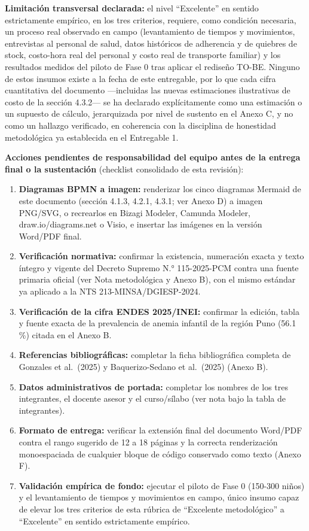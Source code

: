 \documentclass[11pt,a4paper]{article}
\providecommand{\tightlist}{%
  \setlength{\itemsep}{0pt}\setlength{\parskip}{0pt}}
\begin{document}
\textbf{Limitación transversal declarada:} el nivel ``Excelente'' en sentido estrictamente empírico, en los tres criterios, requiere, como condición necesaria, un proceso real observado en campo (levantamiento de tiempos y movimientos, entrevistas al personal de salud, datos históricos de adherencia y de quiebres de stock, costo-hora real del personal y costo real de transporte familiar) y los resultados medidos del piloto de Fase 0 tras aplicar el rediseño TO-BE. Ninguno de estos insumos existe a la fecha de este entregable, por lo que cada cifra cuantitativa del documento ---incluidas las nuevas estimaciones ilustrativas de costo de la sección 4.3.2--- se ha declarado explícitamente como una estimación o un supuesto de cálculo, jerarquizada por nivel de sustento en el Anexo C, y no como un hallazgo verificado, en coherencia con la disciplina de honestidad metodológica ya establecida en el Entregable 1.

\textbf{Acciones pendientes de responsabilidad del equipo antes de la entrega final o la sustentación} (checklist consolidado de esta revisión):

\begin{enumerate}
\def\labelenumi{\arabic{enumi}.}
\tightlist
\item
  \textbf{Diagramas BPMN a imagen:} renderizar los cinco diagramas Mermaid de este documento (sección 4.1.3, 4.2.1, 4.3.1; ver Anexo D) a imagen PNG/SVG, o recrearlos en Bizagi Modeler, Camunda Modeler, draw.io/diagrams.net o Visio, e insertar las imágenes en la versión Word/PDF final.
\item
  \textbf{Verificación normativa:} confirmar la existencia, numeración exacta y texto íntegro y vigente del Decreto Supremo N.° 115-2025-PCM contra una fuente primaria oficial (ver Nota metodológica y Anexo B), con el mismo estándar ya aplicado a la NTS 213-MINSA/DGIESP-2024.
\item
  \textbf{Verificación de la cifra ENDES 2025/INEI:} confirmar la edición, tabla y fuente exacta de la prevalencia de anemia infantil de la región Puno (56.1 \%) citada en el Anexo B.
\item
  \textbf{Referencias bibliográficas:} completar la ficha bibliográfica completa de Gonzales et al.~(2025) y Baquerizo-Sedano et al.~(2025) (Anexo B).
\item
  \textbf{Datos administrativos de portada:} completar los nombres de los tres integrantes, el docente asesor y el curso/sílabo (ver nota bajo la tabla de integrantes).
\item
  \textbf{Formato de entrega:} verificar la extensión final del documento Word/PDF contra el rango sugerido de 12 a 18 páginas y la correcta renderización monoespaciada de cualquier bloque de código conservado como texto (Anexo F).
\item
  \textbf{Validación empírica de fondo:} ejecutar el piloto de Fase 0 (150-300 niños) y el levantamiento de tiempos y movimientos en campo, único insumo capaz de elevar los tres criterios de esta rúbrica de ``Excelente metodológico'' a ``Excelente'' en sentido estrictamente empírico.
\end{enumerate}
\end{document}
